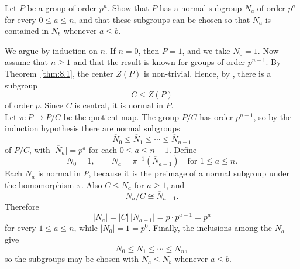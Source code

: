 \documentclass[../Odyssey_Project.tex]{subfiles}
\begin{document}
\begin{exercise}
\label{ex:8.2}
Let $P$ be a group of order $p^n$. Show that $P$ has a normal subgroup $N_a$ of order $p^a$ for every $0 \leq a \leq n$, and that these subgroups can be chosen so that $N_a$ is contained in $N_b$ whenever $a \leq b$.
\end{exercise}
\begin{solution}
We argue by induction on $n$. If $n=0$, then $P=1$, and we take $N_0=1$. Now assume that $n\geq 1$ and that the result is known for groups of order $p^{n-1}$. By Theorem~\ref{thm:8.1}, the center $Z(P)$ is non-trivial. Hence, by , there is a subgroup
\[
    C\leq Z(P)
\]
of order $p$. Since $C$ is central, it is normal in $P$.\\
Let $\pi\colon P\to P/C$ be the quotient map. The group $P/C$ has order $p^{n-1}$, so by the induction hypothesis there are normal subgroups
\[
    \overline{N}_0\leq \overline{N}_1\leq \cdots \leq \overline{N}_{n-1}
\]
of $P/C$, with $\lvert \overline{N}_a\rvert=p^a$ for each $0\leq a\leq n-1$. Define
\[
    N_0=1,
    \qquad
    N_a=\pi^{-1}(\overline{N}_{a-1})
    \quad\text{for }1\leq a\leq n.
\]
Each $N_a$ is normal in $P$, because it is the preimage of a normal subgroup under the homomorphism $\pi$. Also $C\leq N_a$ for $a\geq 1$, and
\[
    N_a/C\cong \overline{N}_{a-1}.
\]
Therefore
\[
    \lvert N_a\rvert
    =\lvert C\rvert\,\lvert \overline{N}_{a-1}\rvert
    =p\cdot p^{a-1}
    =p^a
\]
for every $1\leq a\leq n$, while $\lvert N_0\rvert=1=p^0$. Finally, the inclusions among the $\overline{N}_a$ give
\[
    N_0\leq N_1\leq \cdots \leq N_n,
\]
so the subgroups may be chosen with $N_a\leq N_b$ whenever $a\leq b$.
\end{solution}
\end{document}
